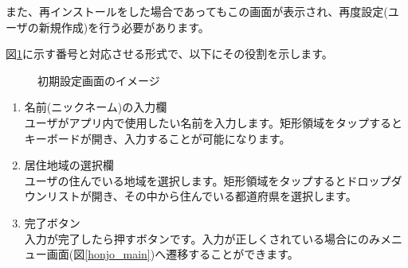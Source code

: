 \documentclass[a4j]{jarticle}
\begin{document}
また、再インストールをした場合であってもこの画面が表示され、再度設定(ユーザの新規作成)を行う必要があります。

図\ref{honjo_setup}に示す番号と対応させる形式で、以下にその役割を示します。

\begin{figure}[H]
    \begin{center}
    \caption {初期設定画面のイメージ}
    \label{honjo_setup}
    \end{center}
\end{figure}

\begin{enumerate}
  \renewcommand{\labelenumi}{\textcircled{\scriptsize \theenumi}}
  \item 名前(ニックネーム)の入力欄\\
        ユーザがアプリ内で使用したい名前を入力します。矩形領域をタップするとキーボードが開き、入力することが可能になります。
  \item 居住地域の選択欄\\
        ユーザの住んでいる地域を選択します。矩形領域をタップするとドロップダウンリストが開き、その中から住んでいる都道府県を選択します。
  \item 完了ボタン\\
        入力が完了したら押すボタンです。入力が正しくされている場合にのみメニュー画面(図\ref{honjo_main})へ遷移することができます。
\end{enumerate}
\end{document}
